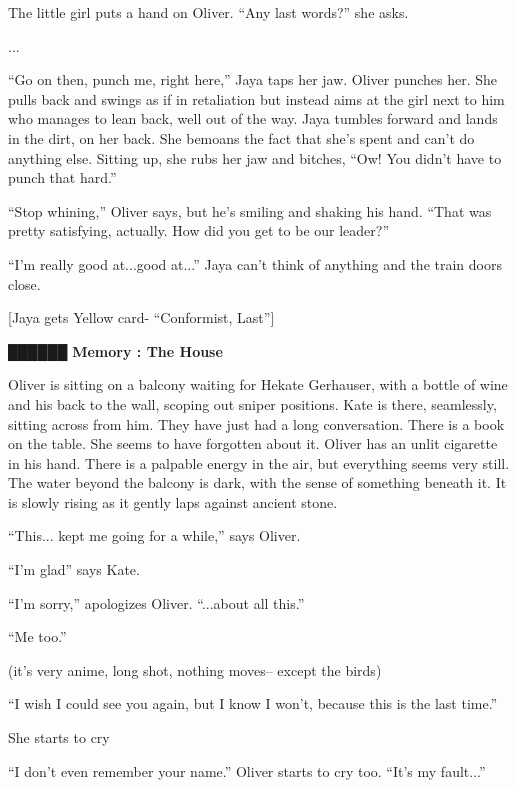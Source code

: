 The little girl puts a hand on Oliver.  ``Any last words?'' she asks.

...

``Go on then, punch me, right here,'' Jaya taps her jaw.  Oliver punches her.   She pulls back and swings as if in retaliation but instead aims at the girl next to him who manages to lean back, well out of the way.  Jaya tumbles forward and lands in the dirt, on her back.   She bemoans the fact that she's spent and can't do anything else.  Sitting up, she rubs her jaw and bitches, ``Ow!  You didn't have to punch that hard.'' 

``Stop whining,'' Oliver says, but he's smiling and shaking his hand.  ``That was pretty satisfying, actually.  How did you get to be our leader?''

``I'm really good at...good at...'' Jaya can't think of anything and the train doors close.



{[}Jaya gets Yellow card- ``Conformist, Last''{]}



 {\LARGE \textbf{ {\color[RGB]{51,51,51}██████} } }  {\LARGE \textbf{ Memory : The House} } 

Oliver is sitting on a balcony waiting for Hekate Gerhauser, with a bottle of wine and his back to the wall, scoping out sniper positions. Kate is there, seamlessly, sitting across from him. They have just had a long conversation. There is a book on the table. She seems to have forgotten about it. Oliver has an unlit cigarette in his hand. There is a palpable energy in the air, but everything seems very still.  The water beyond the balcony is dark, with the sense of something beneath it. It is slowly rising as it gently laps against ancient stone.



``This... kept me going for a while,'' says Oliver.

``I'm glad'' says Kate.

``I'm sorry,'' apologizes Oliver.  ``...about all this.''

``Me too.''

(it's very anime, long shot, nothing moves-- except the birds)

``I wish I could see you again, but I know I won't, because this is the last time.''

She starts to cry

``I don't even remember your name.'' Oliver starts to cry too.  ``It's my fault...''

